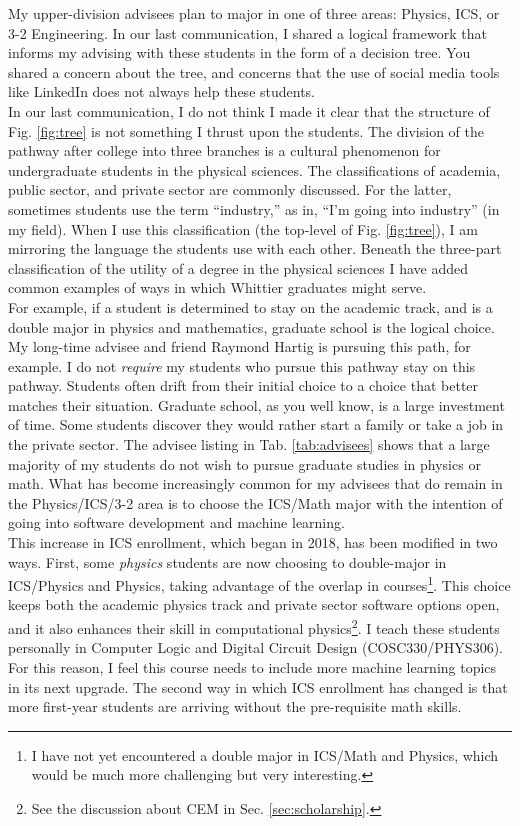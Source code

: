 \documentclass[../../main.tex]{subfiles}
\begin{document}
My upper-division advisees plan to major in one of three areas: Physics, ICS, or 3-2 Engineering.  In our last communication, I shared a logical framework that informs my advising with these students in the form of a decision tree.  You shared a concern about the tree, and concerns that the use of social media tools like LinkedIn does not always help these students.
\\
\vspace{0.15cm}
In our last communication, I do not think I made it clear that the structure of Fig. \ref{fig:tree} is not something I thrust upon the students.  The division of the pathway after college into three branches is a cultural phenomenon for undergraduate students in the physical sciences.  The classifications of academia, public sector, and private sector are commonly discussed.  For the latter, sometimes students use the term ``industry,'' as in, ``I'm going into industry'' (in my field).  When I use this classification (the top-level of Fig. \ref{fig:tree}), I am mirroring the language the students use with each other.  Beneath the three-part classification of the utility of a degree in the physical sciences I have added common examples of ways in which Whittier graduates might serve.
\\
\vspace{0.15cm}
For example, if a student is determined to stay on the academic track, and is a double major in physics and mathematics, graduate school is the logical choice.  My long-time advisee and friend Raymond Hartig is pursuing this path, for example.  I do not \textit{require} my students who pursue this pathway stay on this pathway.  Students often drift from their initial choice to a choice that better matches their situation.  Graduate school, as you well know, is a large investment of time.  Some students discover they would rather start a family or take a job in the private sector.  The advisee listing in Tab. \ref{tab:advisees} shows that a large majority of my students do not wish to pursue graduate studies in physics or math.  What has become increasingly common for my advisees that do remain in the Physics/ICS/3-2 area is to choose the ICS/Math major with the intention of going into software development and machine learning.
\\
\vspace{0.15cm}
This increase in ICS enrollment, which began in 2018, has been modified in two ways.  First, some \textit{physics} students are now choosing to double-major in ICS/Physics and Physics, taking advantage of the overlap in courses\footnote{I have not yet encountered a double major in ICS/Math and Physics, which would be much more challenging but very interesting.}.  This choice keeps both the academic physics track and private sector software options open, and it also enhances their skill in computational physics\footnote{See the discussion about CEM in Sec. \ref{sec:scholarship}.}.  I teach these students personally in Computer Logic and Digital Circuit Design (COSC330/PHYS306).  For this reason, I feel this course needs to include more machine learning topics in its next upgrade.  The second way in which ICS enrollment has changed is that more first-year students are arriving without the pre-requisite math skills.
\end{document}
